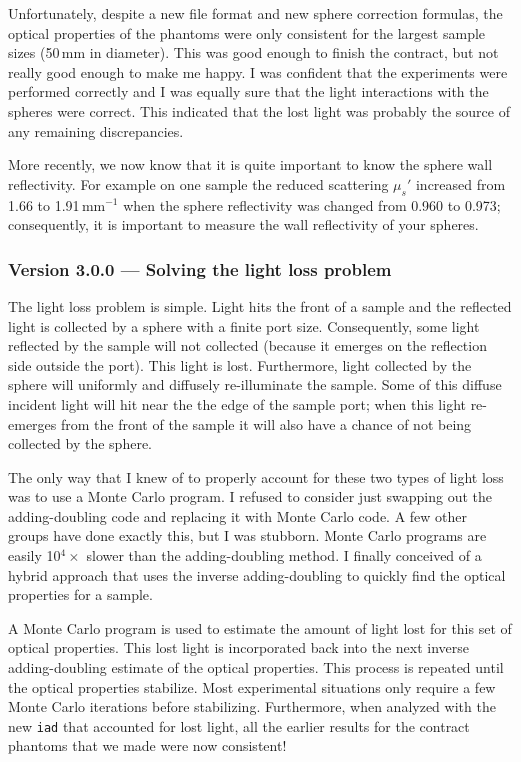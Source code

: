 \documentclass{article}
\newcommand\iadprog{\texttt{iad}}
\begin{document}
Unfortunately, despite a new file format and new sphere correction formulas,
the optical properties of the phantoms were only consistent for the largest
sample sizes (50\,mm in diameter).  This was good enough to finish
the contract, but not really good enough to make me happy.  I was confident
that the experiments were performed correctly and I was equally sure that
the light interactions with the spheres were correct.  This indicated that the
lost light was probably the source of any remaining discrepancies.

More recently, we now know that it is quite important to know the sphere
wall reflectivity.  For example on one sample the reduced scattering $\mu_s'$
increased from 1.66 to 1.91\,mm$^{-1}$ when the sphere reflectivity was 
changed from 0.960 to 0.973; consequently, it is important to measure
the wall reflectivity of your spheres.

\subsubsection*{Version 3.0.0 --- Solving the light loss problem}

The light loss problem is simple.  Light hits the front of a sample and the
reflected light is collected by a sphere with a finite port size.  Consequently,
some light reflected by the sample will not collected (because it emerges on
the reflection side outside the port).  This light is lost.
Furthermore, light collected by the sphere will uniformly and diffusely 
re-illuminate the sample.  Some of this diffuse incident light will hit near the
the edge of the sample port; when this light re-emerges from the front of
the sample it will also have a chance of not being collected by the sphere.

The only way that I knew of to properly account for these two types of light
loss was to use a Monte Carlo program.  I refused to consider just swapping
out the adding-doubling code and replacing it with Monte Carlo code.
A few other groups have done exactly this, but I was stubborn.
Monte Carlo programs are easily 10$^4\times$
slower than the adding-doubling method.  I finally conceived of a hybrid 
approach that uses the inverse adding-doubling to quickly find the optical properties
for a sample.  

A Monte Carlo program is used to estimate the amount of light
lost for this set of optical properties.  This lost light is incorporated 
back into the next inverse adding-doubling estimate of the optical
properties.  This process is repeated until the optical properties
stabilize.  Most experimental situations only require
a few Monte Carlo iterations before stabilizing.  Furthermore, when analyzed
with the new \iadprog{} that accounted for lost light, all the earlier 
results for the contract phantoms that we made were now consistent!
\end{document}
